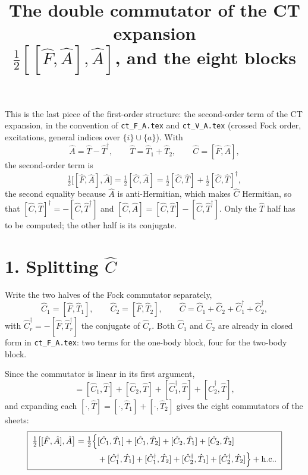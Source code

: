\documentclass[11pt]{article}
\title{\bfseries The double commutator of the CT expansion\\[2pt]
       \large $\tfrac12[[\hat F,\hat A],\hat A]$, and the eight blocks}
\author{}
\date{}
\newcommand{\hc}{\mathrm{h.c.}}
\newcommand{\occ}{i}
\newcommand{\vir}{a}
\begin{document}
\maketitle
\vspace{-2.5em}

\noindent
This is the last piece of the first-order structure: the second-order term of
the CT expansion, in the convention of \texttt{ct\_F\_A.tex} and
\texttt{ct\_V\_A.tex} (crossed Fock order, excitations, general indices over
$\{\occ\}\cup\{\vir\}$). With
\begin{equation}
  \hat A=\hat T-\hat T^\dagger,
  \qquad
  \hat T=\hat T_1+\hat T_2,
  \qquad
  \hat C=[\hat F,\hat A],
  \label{eq:setup}
\end{equation}
the second-order term is
\begin{equation}
  \tfrac12\bigl[[\hat F,\hat A],\hat A\bigr]
   =\tfrac12[\hat C,\hat A]
   =\tfrac12[\hat C,\hat T]+\tfrac12[\hat C,\hat T]^\dagger,
  \label{eq:first}
\end{equation}
the second equality because $\hat A$ is anti-Hermitian, which makes $\hat C$
Hermitian, so that $[\hat C,\hat T]^\dagger=-[\hat C,\hat T^\dagger]$ and
$[\hat C,\hat A]=[\hat C,\hat T]-[\hat C,\hat T^\dagger]$. Only the $\hat T$
half has to be computed; the other half is its conjugate.

\section*{1. Splitting \texorpdfstring{$\hat C$}{C}}

Write the two halves of the Fock commutator separately,
\begin{equation}
  \hat C_1=[\hat F,\hat T_1],
  \qquad
  \hat C_2=[\hat F,\hat T_2],
  \qquad
  \hat C=\hat C_1+\hat C_2+\hat C_1^\dagger+\hat C_2^\dagger,
  \label{eq:Csplit}
\end{equation}
with $\hat C_r^\dagger=-[\hat F,\hat T_r^\dagger]$ the conjugate of
$\hat C_r$. Both $\hat C_1$ and $\hat C_2$ are already in closed form in
\texttt{ct\_F\_A.tex}: two terms for the one-body block, four for the two-body
block.

Since the commutator is linear in its first argument,
\begin{equation}
  [\hat C,\hat T]
   =[\hat C_1,\hat T]+[\hat C_2,\hat T]
    +[\hat C_1^\dagger,\hat T]+[\hat C_2^\dagger,\hat T],
  \label{eq:four}
\end{equation}
and expanding each $[\cdot,\hat T]=[\cdot,\hat T_1]+[\cdot,\hat T_2]$ gives the
eight commutators of the sheets:
\begin{equation}
  \boxed{\;
  \begin{aligned}
  \tfrac12\bigl[[\hat F,\hat A],\hat A\bigr]
   =\tfrac12\Bigl\{&
    [\hat C_1,\hat T_1]+[\hat C_1,\hat T_2]
   +[\hat C_2,\hat T_1]+[\hat C_2,\hat T_2]\\
   &+[\hat C_1^\dagger,\hat T_1]+[\hat C_1^\dagger,\hat T_2]
   +[\hat C_2^\dagger,\hat T_1]+[\hat C_2^\dagger,\hat T_2]\Bigr\}
   +\hc .
  \end{aligned}\;}
  \label{eq:eight}
\end{equation}
\end{document}
